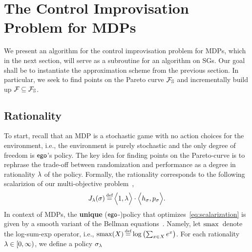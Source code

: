 \section{The Control Improvisation Problem for MDPs}
\label{sec:mdps}

We present an algorithm for the control improvisation problem for
MDPs, which in the next section, will serve as a subroutine for an
algorithm on SGs. Our goal shall be to instantiate the approximation
scheme from the previous section. In particular, we seek
to find points on the Pareto curve $\mathcal{F}_{\mathbb{S}}$ and
incrementally build up $\mathcal{F}_{} \subseteq \mathcal{F}_{\mathbb{S}}$.
\subsection{Rationality}
To start, recall that an MDP is a stochastic game with no action
choices for the environment, i.e., the environment is purely
stochastic and the only degree of freedom is $\mathsf{ego}$'s policy.  The
key idea for finding points on the Pareto-curve is to rephrase the
trade-off between randomization and performance as a degree in
rationality $\lambda$ of the policy.  Formally, the rationality
corresponds to the following scalarizion of our multi-objective
problem~\cite{DBLP:journals/corr/abs-1805-00909},
\begin{equation}
  \label{eq:scalarization}
  J_\rat(\sched) \eqdef \Big\langle 1, \rat\Big\rangle \cdot \Big\langle\rndp_\sched, \scp_\sched\Big\rangle.
\end{equation}
In context of MDPs, the \textbf{unique} ($\mathsf{ego}$-)policy that
optimizes~\eqref{eq:scalarization} is given by a smooth variant of the
Bellman equations~\cite{mceThesis, DBLP:conf/cav/Vazquez-Chanlatte20}. Namely, let $\operatorname*{\mathrm{smax}}{}$ denote
the log-sum-exp operator, i.e.,
$\smoothmax(X) \eqdef \log \left( \sum_{x\in X} e^x \right)$. For each
rationality $\lambda \in [0, \infty)$, we define a policy $\sigma_\lambda$
